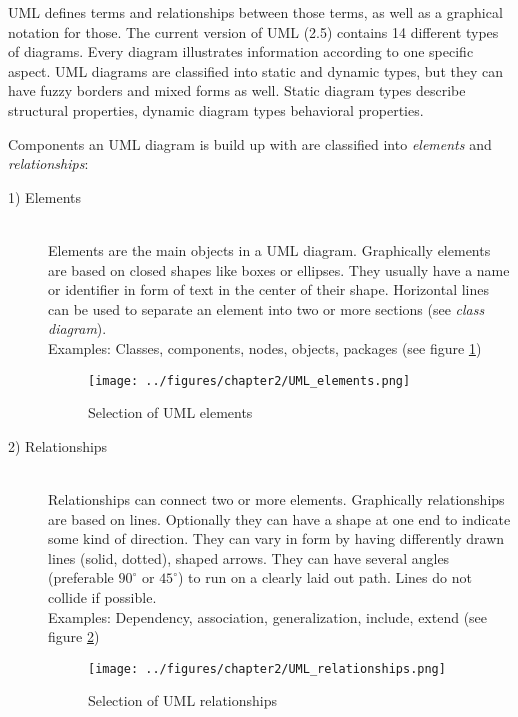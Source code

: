 \documentclass[twoside, openright, 12pt]{book}
\begin{document}
UML defines terms and relationships between those terms, as well as a graphical notation for those.
The current version of UML (2.5) contains 14 different types of diagrams.
Every diagram illustrates information according to one specific aspect.
UML diagrams are classified into static and dynamic types, but they can have fuzzy borders and mixed forms as well.
Static diagram types describe structural properties, dynamic diagram types behavioral properties.

Components an UML diagram is build up with are classified into \textit{elements} and \textit{relationships}:

\begin{description}
\item[1) Elements]\hfill \\
Elements are the main objects in a UML diagram.
Graphically elements are based on closed shapes like boxes or ellipses.
They usually have a name or identifier in form of text in the center of their shape. Horizontal lines can be used to separate an element into two or more sections (see \textit{class diagram}). \\
Examples: Classes, components, nodes, objects, packages (see figure \ref{fig:UML_elements})

\begin{figure}[htb]
	\centering
	\texttt{[image: ../figures/chapter2/UML\_elements.png]}
	\caption{Selection of UML elements}
	\label{fig:UML_elements}
\end{figure}

\item[2) Relationships]\hfill \\
Relationships can connect two or more elements.
Graphically relationships are based on lines.
Optionally they can have a shape at one end to indicate some kind of direction.
They can vary in form by having differently drawn lines (solid, dotted), shaped arrows.
They can have several angles (preferable $90^{\circ}$ or $45^{\circ}$) to run on a clearly laid out path.
Lines do not collide if possible. \\
Examples: Dependency, association, generalization, include, extend (see figure \ref{fig:UML_relationships})

\begin{figure}[htb]
	\centering
	\texttt{[image: ../figures/chapter2/UML\_relationships.png]}
	\caption{Selection of UML relationships}
	\label{fig:UML_relationships}
\end{figure}
\end{description}
\end{document}
